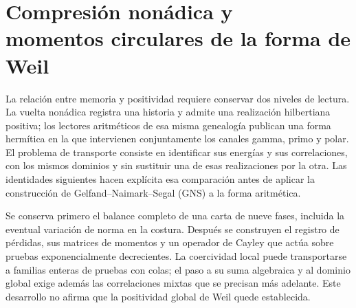 \clearpage
\section[Compresión nonádica y momentos circulares de la forma de Weil]{Compresión nonádica y\\momentos circulares de la forma de Weil}
\label{viii:sec:transporte-momentos}
\label{viii:tm-add-seccion}

La relación entre memoria y positividad requiere conservar dos niveles de lectura.
La vuelta nonádica registra una historia y admite una realización hilbertiana
positiva; los lectores aritméticos de esa misma genealogía publican una forma
hermítica en la que intervienen conjuntamente los canales gamma, primo y polar.
El problema de transporte consiste en identificar sus energías y sus correlaciones,
con los mismos dominios y sin sustituir una de esas realizaciones por la otra.
Las identidades siguientes hacen explícita esa comparación antes de aplicar
la construcción de Gelfand--Naimark--Segal (GNS) a la forma aritmética.

Se conserva primero el balance completo de una carta de nueve fases, incluida
la eventual variación de norma en la costura. Después se construyen el registro
de pérdidas, sus matrices de momentos y un operador de Cayley que actúa sobre
pruebas exponencialmente decrecientes. La coercividad local puede transportarse
a familias enteras de pruebas con colas; el paso a su suma algebraica y al dominio
global exige además las correlaciones mixtas que se precisan más adelante.
Este desarrollo no afirma que la positividad global de Weil quede establecida.

% 
% 
% 
% 

